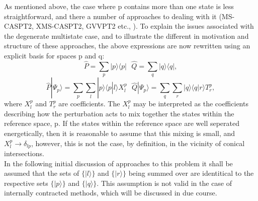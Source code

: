 \documentclass[12pt]{article}
\begin{document}
\noindent As mentioned above, the case where $\mathrm{p}$ contains more than one state is less straightforward, and there
a number of approaches to dealing with it (MS-CASPT2, XMS-CASPT2, GVVPT2 etc., ).  To explain the issues associated with the
degenerate multistate case, and to illustrate the different in motivation and structure of these approaches,
the above expressions are now rewritten using an explicit basis for spaces $\mathrm{p}$ and $\mathrm{q}$:
\begin{equation*}
\hat{P} =\sum_{p} | p \rangle \langle p |  \text{\ \ \ \ \ }
\hat{Q} =\sum_{q} | q \rangle \langle q | ,
\end{equation*}
\begin{equation*}
\hat{P}|\Psi_{p}\rangle =\sum_{p}\sum_{l} | p \rangle \langle p | l \rangle X_{l}^{p}
\text{ \ \ \ \ \ \ }
\hat{Q}|\Psi_{p}\rangle =\sum_{q}\sum_{r} | q \rangle \langle q | r \rangle T_{r}^{p},
\end{equation*}
where $X_{l}^{p}$ and $T_{r}^{p}$ are coefficients. The $X_{l}^{p}$ may be interpreted
as the coefficients describing how the perturbation acts to mix together the
states within the reference space, $\mathrm{p}$. If the states within the reference 
space are well seperated energetically, then it is reasonable to assume that this
mixing is small, and $X_{l}^{p} \rightarrow \delta_{lp} $, however, this is not the case,
by definition, in the vicinity of conical intersections.\\

\noindent In the following initial discussion of approaches to this problem it shall be assumed that 
the sets of $\{|l\rangle\}$ and $\{|r\rangle\}$ being summed over are identitical to the respective sets
$\{|p\rangle\}$ and $\{|q\rangle\}$. This assumption is not valid in the case of internally contracted 
methods, which will be discussed in due course.\\
\end{document}
